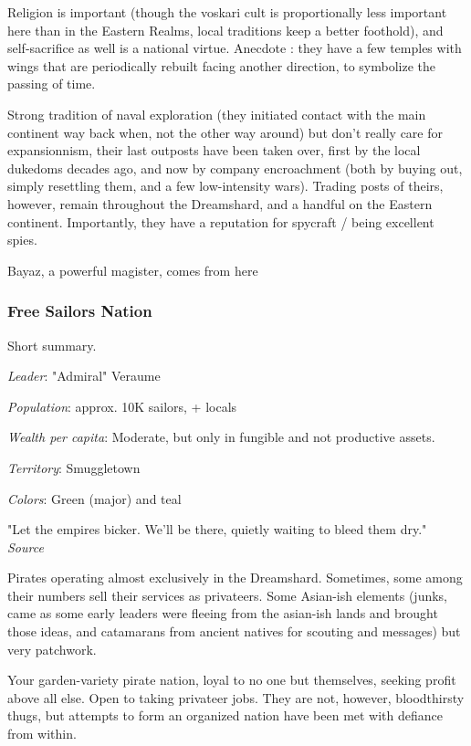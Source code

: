 Religion is important (though the voskari cult is proportionally less important here than in the Eastern Realms, local traditions keep a better foothold), and self-sacrifice as well is a national virtue. Anecdote : they have a few temples with wings that are periodically rebuilt facing another direction, to symbolize the passing of time.

Strong tradition of naval exploration (they initiated contact with the main continent way back when, not the other way around) but don't really care for expansionnism, their last outposts have been taken over, first by the local dukedoms decades ago, and now by company encroachment (both by buying out, simply resettling them, and a few low-intensity wars). Trading posts of theirs, however, remain throughout the Dreamshard, and a handful on the Eastern continent. Importantly, they have a reputation for spycraft / being excellent spies.



Bayaz, a powerful magister, comes from here


\subsubsection{Free Sailors Nation}

Short summary.

\textit{Leader}: "Admiral" Veraume

\textit{Population}: approx. 10K sailors, + locals

\textit{Wealth per capita}: Moderate, but only in fungible and not productive assets.

\textit{Territory}: Smuggletown
    
\textit{Colors}: Green (major) and teal

\begin{rpg-quotebox}
    "Let the empires bicker. We'll be there, quietly waiting to bleed them dry." \\ \textendash \textit{Source}
\end{rpg-quotebox}


Pirates operating almost exclusively in the Dreamshard. Sometimes, some among their numbers sell their services as privateers. Some Asian-ish elements (junks, came as some early leaders were fleeing from the asian-ish lands and brought those ideas, and catamarans from ancient natives for scouting and messages) but very patchwork. 
	
Your garden-variety pirate nation, loyal to no one but themselves, seeking profit above all else. Open to taking privateer jobs. They are not, however, bloodthirsty thugs, but attempts to form an organized nation have been met with defiance from within.




